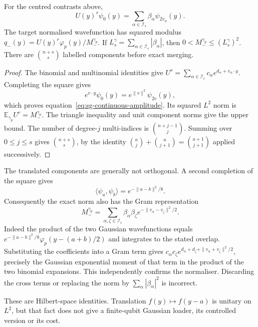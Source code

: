 \begin{proposition}
\label{prop:sg-continuous}
For the centred contrasts above,
\begin{equation}
 U(y)^s\psi_0(y)=\sum_{\alpha\in\mathcal I_s}
                         \beta_\alpha\psi_{2v_\alpha}(y).
 \label{eq:sg-continuous-amplitude}
\end{equation}
The target normalised wavefunction has squared modulus
$q_-(y)=U(y)^r\varphi_p(y)/M_-^{\gamma_p}$.
If $L_s^\gamma=\sum_{\alpha\in\mathcal I_s}|\beta_\alpha|$, then
$0<M_-^{\gamma_p}\leq(L_s^\gamma)^2$. There are
$\binom{n+s}{s}$ labelled components before exact merging.
\end{proposition}
\begin{proof}
The binomial and multinomial identities give
$U^s=\sum_{\alpha\in\mathcal I_s}c_\alpha
e^{d_\alpha+v_\alpha\cdot y}$.
Completing the square gives
\[
 e^{v\cdot y}\psi_0(y)
   =e^{\|v\|^2}\psi_{2v}(y),
\]
which proves equation~\eqref{eq:sg-continuous-amplitude}. Its squared
$L^2$ norm is $\mathbb E_{\gamma_p}U^r=M_-^{\gamma_p}$.
The triangle inequality and unit component norms give the upper bound.
The number of degree-$j$ multi-indices is $\binom{n+j-1}{j}$.
Summing over $0\leq j\leq s$ gives $\binom{n+s}{s}$, by the
identity $\binom{a}{j}+\binom{a}{j+1}=\binom{a+1}{j+1}$
applied successively.
\end{proof}

The translated components are generally not orthogonal. A second
completion of the square gives
\[
 \langle\psi_a,\psi_b\rangle
 =e^{-\|a-b\|^2/8}.
\]
Consequently the exact norm also has the Gram representation
\begin{equation}
 M_-^{\gamma_p}
  =\sum_{\alpha,\zeta\in\mathcal I_s}
       \beta_\alpha\beta_\zeta
       e^{-\|v_\alpha-v_\zeta\|^2/2}.
 \label{eq:sg-gaussian-gram}
\end{equation}
Indeed the product of the two Gaussian wavefunctions equals
$e^{-\|a-b\|^2/8}\varphi_p(y-(a+b)/2)$ and integrates to the stated
overlap. Substituting the coefficients into a Gram term gives
$c_\alpha c_\zeta
e^{d_\alpha+d_\zeta+\|v_\alpha+v_\zeta\|^2/2}$, precisely the
Gaussian exponential moment of that term in the product of the two
binomial expansions. This independently confirms the normaliser.
Discarding the cross terms or replacing the norm by
$\sum_\alpha|\beta_\alpha|^2$ is incorrect.

These are Hilbert-space identities. Translation
$f(y)\mapsto f(y-a)$ is unitary on $L^2$, but that fact does not give
a finite-qubit Gaussian loader, its controlled version or its cost.

